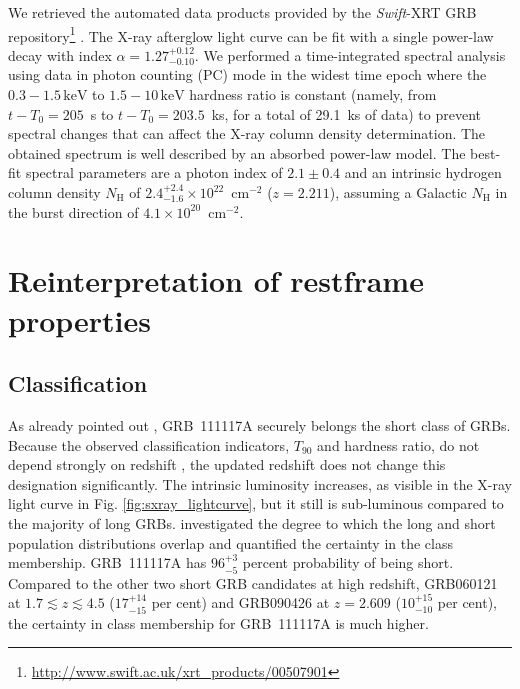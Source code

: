 \documentclass{aa}    %
\begin{document}
We retrieved the automated data products provided by the \textit{Swift}-XRT GRB
repository\footnote{\url{http://www.swift.ac.uk/xrt\_products/00507901}} \citep{Evans2009}. 
The X-ray afterglow light curve
can be fit with a single power-law decay with index
$\alpha=1.27_{-0.10}^{+0.12}$. We performed a time-integrated spectral analysis
using data in photon counting (PC) mode in the widest time epoch where the
$0.3-1.5\,\mathrm{keV}$ to $1.5-10\,\mathrm{keV}$ hardness ratio is constant
(namely, from $t-T_0 = 205$~s to $t-T_0 = 203.5$~ks, for a total of 29.1~ks of
data) to prevent spectral changes that can affect the X-ray column
density determination. The obtained spectrum is well described by an absorbed
power-law model. The best-fit spectral parameters are a photon index of $2.1 \pm
0.4$ and an intrinsic hydrogen column density $N_{\mathrm{H}}$ of $2.4_{-1.6}^{+2.4} \times 10^{22}$~cm$^{-2}$ ($z=2.211$), assuming a Galactic $N_{\mathrm{H}}$ in the burst direction of $4.1 \times 10^{20}$~cm$^{-2}$.




\section{Reinterpretation of restframe properties}


\subsection{Classification}

As already pointed out \citep{Margutti2012, Sakamoto2013}, GRB~111117A securely 
belongs the short class of GRBs. Because the observed classification
indicators, $T_{90}$ and hardness ratio, do not depend strongly on redshift
\citep{Littlejohns2013a}, the updated redshift does not change this designation
significantly. The intrinsic luminosity increases, as visible in the X-ray light curve
in Fig. \ref{fig:sxray_lightcurve}, but it still is sub-luminous compared to
the majority of long GRBs. \citet{Bromberg2013} investigated the degree to which the
long and short population distributions overlap and quantified the certainty in
the class membership. GRB~111117A has $96_{-5}^{+3}$ percent probability of
being short. Compared to the other two short GRB candidates at high redshift, GRB060121
\citep{DeUgartePostigo2006, Levan2006} at $1.7 \lesssim z \lesssim 4.5$
($17_{-15}^{+14}$ per cent) and GRB090426 \citep{Antonelli2009, Levesque2010,
	Thone2011} at $z = 2.609$ ($10_{-10}^{+15}$ per cent), the certainty in class
membership for GRB~111117A is much higher.
\end{document}

